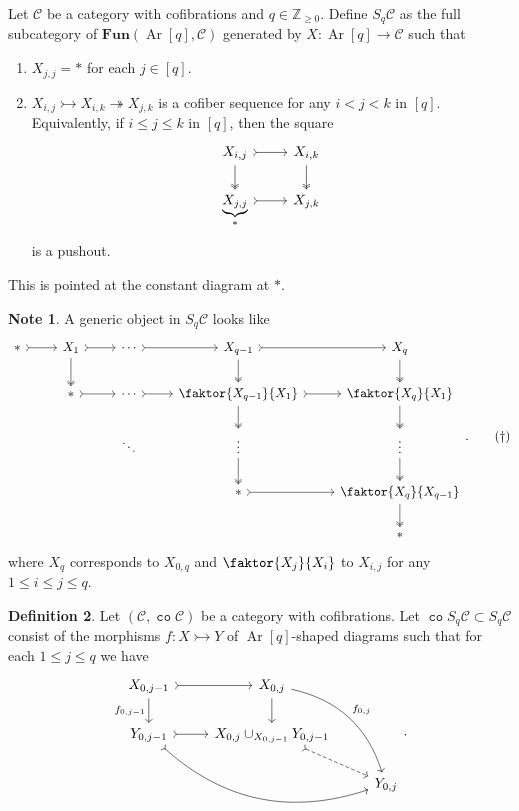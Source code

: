 \documentclass[10pt,letterpaper,cm]{nupset}
\theoremstyle{definition}
\newtheorem{definition}{Definition}
\newtheorem{note}[definition]{Note}
\theoremstyle{theorem}
\theoremstyle{remark}
\newcommand{\Z}{\mathbb Z}
\newcommand{\1}{\mathbf{1}}
\renewcommand{\c}{\mathscr{C}}
\newcommand{\0}{\vec 0}
\DeclareMathOperator{\co}{\mathtt{co}}
\DeclareMathOperator{\Ar}{Ar}
\begin{document}
Let $\c$ be a category with cofibrations and $q\in \Z_{\geq 0}$. Define $S_q\c$ as the full subcategory of $\mathbf{Fun}(\Ar[q], \c)$ generated by $X: \Ar[q] \to \c$ such that
\begin{enumerate}
\item $X_{j, j} = \ast$ for each $j \in [q]$.
\item $X_{i, j} \rightarrowtail X_{i, k} \twoheadrightarrow X_{j, k}$ is a cofiber sequence for any $i < j < k$ in $[q]$. Equivalently, if $i\leq j\leq k$ in $[q]$, then the square
\[
\begin{tikzcd}
{X_{i,j}} \arrow[d, two heads] \arrow[r, tail] & {X_{i,k}} \arrow[d, two heads] \\
{\underbrace{X_{j,j}}_{\ast}} \arrow[r, tail] & {X_{j,k}}
\end{tikzcd}
\]
is a pushout. 
\end{enumerate}
This is pointed at the constant diagram at $\ast$.


\begin{note}\label{note}
A generic object in $S_q\c$ looks like
\[ \label{eqn:D} 
\begin{tikzcd}
\ast \arrow[r, tail] & X_1 \arrow[r, tail] \arrow[d, two heads] & \cdots \arrow[r, tail] & X_{q-1} \arrow[r, tail] \arrow[d, two heads] & X_q \arrow[d, two heads] \\
 & \ast \arrow[r, tail] & \cdots \arrow[r, tail] & \faktor{X_{q-1}}{X_1} \arrow[d, two heads] \arrow[r, tail] & \faktor{X_q}{X_1} \arrow[d, two heads] \\
 &  & \ddots & \vdots \arrow[d, two heads] & \vdots \arrow[d, two heads] \\
 &  &  & \ast \arrow[r, tail] & \faktor{X_q}{X_{q-1}} \arrow[d, two heads] \\
 &  &  &  & \ast
\end{tikzcd}. \tag{$\dagger$}
\] where $X_q$ corresponds to $X_{0, q}$ and $\faktor{X_j}{X_i}$ to $X_{i, j}$ for any $1 \leq i \leq j \leq q$. 
\end{note}

\begin{definition}
Let $\left(\c, \co{\c}\right)$ be a category with cofibrations. Let $\co{S_q}\c \subset S_q \c$ consist of the morphisms $f: X \rightarrowtail Y$ of $\Ar[q]$-shaped diagrams such that for each $1\leq j \leq q$ we have
\[
\begin{tikzcd}
{X_{0, j-1}} \arrow[d, "{f_{0, j-1}}"'] \arrow[r, tail] & {X_{0, j}} \arrow[d] \arrow[rdd, "{f_{0, j}}", bend left] &  \\
{Y_{0, j-1}} \arrow[r, tail] \arrow[rrd, tail, bend right] & {X_{0, j} \cup_{X_{0, j-1}} Y_{0, j-1}} \arrow[rd, dashed, tail] &  \\
 &  & {Y_{0, j}}
\end{tikzcd}.
\]
\end{definition}
\end{document}
